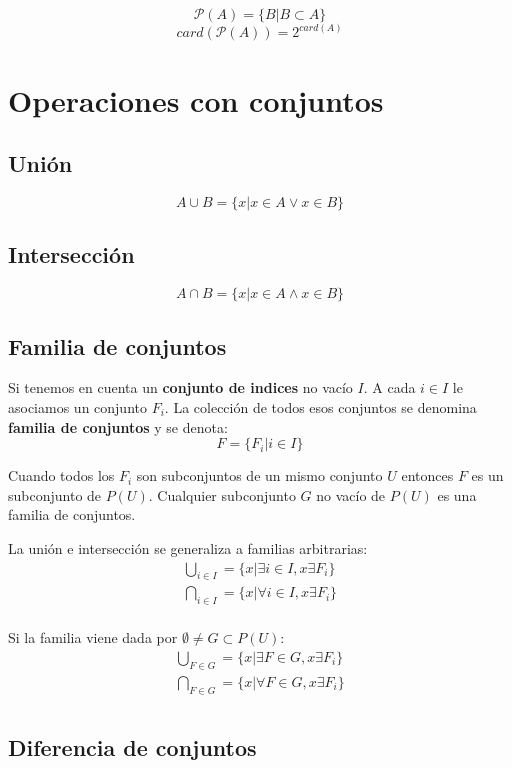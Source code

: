 \[
\mathcal{P}(A) = \{ B | B \subset A \}
\]
\[
card(\mathcal{P}(A))=2^{card(A)}
\]

\section{Operaciones con conjuntos}

\subsection{Unión}

\[
A \cup B = \{x | x \in A \vee x \in B\}
\]

\subsection{Intersección}

\[
A \cap B = \{x | x \in A \wedge x \in B\}
\]

\subsection{Familia de conjuntos}

Si tenemos en cuenta un \textbf{conjunto de indices} no vacío $I$. A cada $i \in I$ le asociamos un conjunto $F_i$. La colección de todos esos conjuntos se denomina \textbf{familia de conjuntos} y se denota:
\[
F = \{F_i | i \in I\}
\]

Cuando todos los $F_i$ son subconjuntos de un mismo conjunto $U$ entonces $F$ es un subconjunto de $P(U)$. Cualquier subconjunto $G$ no vacío de $P(U)$ es una familia de conjuntos.

La unión e intersección se generaliza a familias arbitrarias:
\begin{align*}
\bigcup_{i \in I} = \{x | \exists i \in I, x \exists F_i \} \\
\bigcap_{i \in I} = \{x | \forall i \in I, x \exists F_i \} \\
\end{align*}

Si la familia viene dada por $\emptyset  \neq G \subset P(U)$:
\begin{align*}
\bigcup_{F \in G} = \{x | \exists F \in G, x \exists F_i \} \\
\bigcap_{F \in G} = \{x | \forall F \in G, x \exists F_i \} \\
\end{align*}

\subsection{Diferencia de conjuntos}

